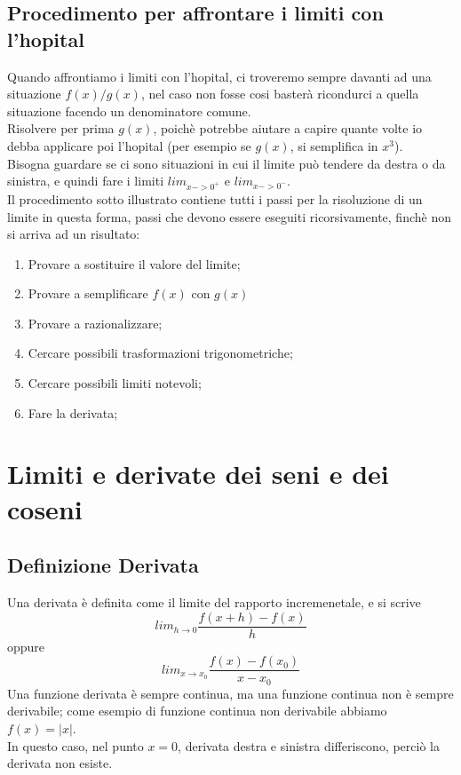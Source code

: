 \documentclass[11pt]{article}
\begin{document}
\subsection{Procedimento per affrontare i limiti con l'hopital}
Quando affrontiamo i limiti con l'hopital, ci troveremo sempre davanti ad una situazione 
$f(x)/g(x)$, nel caso non fosse cosi basterà ricondurci a quella situazione facendo un 
denominatore comune.\\
Risolvere per prima $g(x)$, poichè potrebbe aiutare a capire quante volte io debba applicare poi 
l'hopital (per esempio se $g(x)$, si semplifica in $x^{3}$).\\
Bisogna guardare se ci sono situazioni in cui il limite può tendere da destra o da sinistra, 
e quindi fare i limiti $lim_{x->0^{+}}$ e $lim_{x->0^{-}}$.\\
Il procedimento sotto illustrato contiene tutti i passi per la risoluzione di un limite in questa 
forma, passi che devono essere eseguiti ricorsivamente, finchè non si arriva ad un risultato:\\
\begin{enumerate}
    \item Provare a sostituire il valore del limite;
    \item Provare a semplificare $f(x)$ con $g(x)$
    \item Provare a razionalizzare;
    \item Cercare possibili trasformazioni trigonometriche;
    \item Cercare possibili limiti notevoli;
    \item Fare la derivata;
\end{enumerate}
\section{Limiti e derivate dei seni e dei coseni}
\subsection{Definizione Derivata}
Una derivata è definita come il limite del rapporto incremenetale, e si scrive $$lim_{h \rightarrow 0}\frac{f(x+h)-f(x)}{h}$$ oppure 
$$lim_{x \rightarrow x_{0}}\frac{f(x)-f(x_{0})}{x-x_{0}}$$
Una funzione derivata è sempre continua, ma una funzione continua non è sempre derivabile; come esempio di funzione continua non derivabile abbiamo $f(x) = |x|$.\\
In questo caso, nel punto $x=0$, derivata destra e sinistra differiscono, perciò la derivata non esiste.
\end{document}
